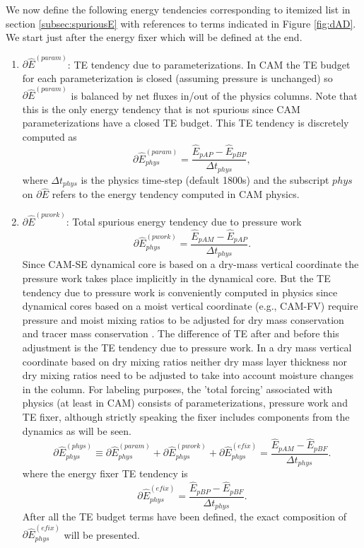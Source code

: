 \documentclass{agujournal}
\newcommand*{\gi}[1]{\widehat{#1}}
\begin{document}
We now define the following energy tendencies corresponding to itemized list in section \ref{subsec:spuriousE} with references to terms indicated in Figure \ref{fig:dAD}. We start just after the energy fixer which will be defined at the end.
\begin{enumerate}
%
\item $\partial \gi{E}^{(param)}$: TE tendency due to parameterizations. In CAM the TE budget for each parameterization is closed (assuming pressure is unchanged) so $\partial \gi{E}^{(param)}$ is balanced by net fluxes in/out of the physics columns. Note that this is the only energy tendency that is not spurious since CAM parameterizations have a closed TE budget. This TE tendency is discretely computed as
\begin{equation}
\partial \gi{E}_{phys}^{({param})}=\frac{\gi{E}_{pAP}-\gi{E}_{pBP}}{\Delta t_{phys}},
\end{equation}
where $\Delta t_{phys}$ is the physics time-step (default 1800s) and the subscript $phys$ on $\partial \gi{E}$ refers to the energy tendency computed in CAM physics. 
%
\item $\partial \gi{E}^{({pwork})}$: Total spurious energy tendency due to pressure work
\begin{equation}
\partial \gi{E}_{phys}^{({pwork})}=\frac{\gi{E}_{pAM}-\gi{E}_{pAP}}{\Delta t_{phys}}.
\end{equation}
Since CAM-SE dynamical core is based on a dry-mass vertical coordinate the pressure work takes place implicitly in the dynamical core. But the TE tendency due to pressure work is conveniently computed in physics since dynamical cores based on a moist vertical coordinate (e.g., CAM-FV) require pressure and moist mixing ratios to be adjusted for dry mass conservation and tracer mass conservation \citep[section 3.1.8 in ][]{CAM5}. The difference of TE after and before this adjustment is the TE tendency due to pressure work. In a dry mass vertical coordinate based on dry mixing ratios neither dry mass layer thickness nor dry mixing ratios need to be adjusted to take into account moisture changes in the column. For labeling purposes, the 'total forcing' associated with physics (at least in CAM) consists of parameterizations, pressure work and TE fixer, although strictly speaking the fixer includes components from the dynamics as will be seen.
\begin{equation}
\partial \gi{E}_{phys}^{({phys})}\equiv \partial \gi{E}_{phys}^{({param})}+\partial \gi{E}_{phys}^{({pwork})}+\partial \gi{E}_{phys}^{({efix})}=\frac{\gi{E}_{pAM}-\gi{E}_{pBF}}{\Delta t_{phys}}.
\end{equation}
where the energy fixer TE tendency is
\begin{equation}
\partial \gi{E}_{phys}^{({efix})}=\frac{\gi{E}_{pBP}-\gi{E}_{pBF}}{\Delta t_{phys}}.
\label{efix.def}
\end{equation}
After all the TE budget terms have been defined, the exact composition of $\partial \gi{E}_{phys}^{({efix})}$ will be presented.


\end{enumerate}
\end{document}
